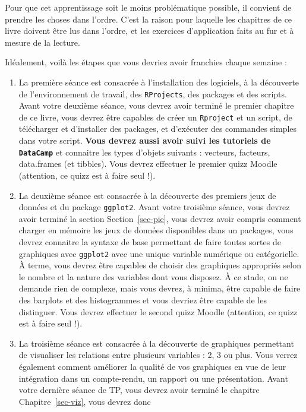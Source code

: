 \documentclass[
  a4paper,
  DIV=11,
  numbers=noendperiod,
  oneside]{scrreprt}
\begin{document}
Pour que cet apprentissage soit le moins problématique possible, il
convient de prendre les choses dans l'ordre. C'est la raison pour
laquelle les chapitres de ce livre doivent être lus dans l'ordre, et les
exercices d'application faits au fur et à mesure de la lecture.

Idéalement, voilà les étapes que vous devriez avoir franchies chaque
semaine :

\begin{enumerate}
\def\labelenumi{\arabic{enumi}.}
\item
  La première séance est consacrée à l'installation des logiciels, à la
  découverte de l'environnement de travail, des \texttt{RProjects}, des
  packages et des scripts. Avant votre deuxième séance, vous devrez
  avoir terminé le premier chapitre de ce livre, vous devrez être
  capables de créer un \texttt{Rproject} et un script, de télécharger et
  d'installer des packages, et d'exécuter des commandes simples dans
  votre script. \textbf{Vous devrez aussi avoir suivi les tutoriels de
  \texttt{DataCamp}} et connaitre les types d'objets suivants :
  vecteurs, facteurs, data.frames (et tibbles). Vous devrez effectuer le
  premier quizz Moodle (attention, ce quizz est à faire seul !).
\item
  La deuxième séance est consacrée à la découverte des premiers jeux de
  données et du package \texttt{ggplot2}. Avant votre troisième séance,
  vous devrez avoir terminé la section Section~\ref{sec-pie}, vous
  devrez avoir compris comment charger en mémoire les jeux de données
  disponibles dans un packages, vous devrez connaitre la syntaxe de base
  permettant de faire toutes sortes de graphiques avec \texttt{ggplot2}
  avec une unique variable numérique ou catégorielle. À terme, vous
  devrez être capables de choisir des graphiques appropriés selon le
  nombre et la nature des variables dont vous disposez. À ce stade, on
  ne demande rien de complexe, mais vous devrez, à minima, être capable
  de faire des barplots et des histogrammes et vous devriez être capable
  de les distinguer. Vous devrez effectuer le second quizz Moodle
  (attention, ce quizz est à faire seul !).
\item
  La troisième séance est consacrée à la découverte de graphiques
  permettant de visualiser les relations entre plusieurs variables : 2,
  3 ou plus. Vous verrez également comment améliorer la qualité de vos
  graphiques en vue de leur intégration dans un compte-rendu, un rapport
  ou une présentation. Avant votre dernière séance de TP, vous devrez
  avoir terminé le chapitre Chapitre~\ref{sec-viz}, vous devrez donc

\end{enumerate}
\end{document}
